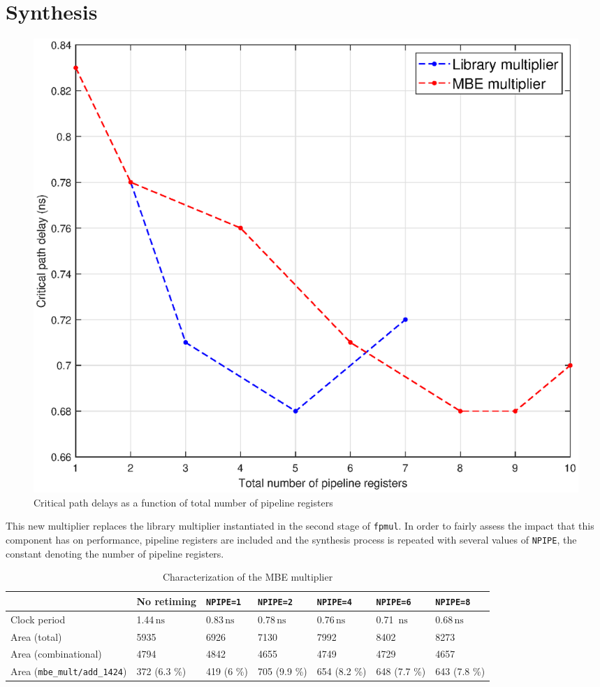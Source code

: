 \section{Synthesis}
\begin{figure}
	\includegraphics[width=\textwidth]{chapter2/images/delays.eps}
	\caption{Critical path delays as a function of total number of pipeline registers}
	\label{fig:delays}
\end{figure}
This new multiplier replaces the library multiplier instantiated in the second stage of \texttt{fpmul}. In order to fairly assess the impact that this component has on performance, pipeline registers are included and the synthesis process is repeated with several values of \texttt{NPIPE}, the constant denoting the number of pipeline registers.
\begin{table}
\begin{tabular}{|l|l|l|l|l|l|l|}\hline
	& No retiming & \texttt{NPIPE=1} & \texttt{NPIPE=2} & \texttt{NPIPE=4} & \texttt{NPIPE=6} & \texttt{NPIPE=8}\\\hline
	Clock period & 1.44$\,\textrm{ns}$ & 0.83$\,\textrm{ns}$& 0.78$\,\textrm{ns}$& 0.76$\,\textrm{ns}$ & 0.71 $\,\textrm{ns}$& 0.68$\,\textrm{ns}$ \\\hline
	Area (total) & 5935 & 6926 & 7130 & 7992 & 8402 & 8273 \\\hline
	Area (combinational) & 4794 & 4842 & 4655 & 4749 & 4729 & 4657 \\\hline
	Area (\texttt{mbe\_mult/add\_1424}) & 372 (6.3 \%)  & 419 (6 \%)  &  705 (9.9 \%)& 654 (8.2 \%) & 648 (7.7 \%) & 643 (7.8 \%)\\\hline
\end{tabular}
\caption{Characterization of the MBE multiplier}
\label{tab:MBE}
\end{table}
